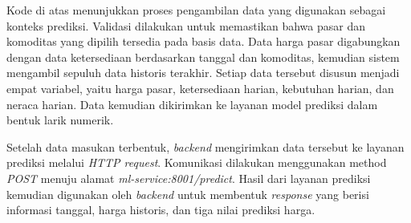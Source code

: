 \begin{code}
\end{code}

Kode di atas menunjukkan proses pengambilan data yang digunakan sebagai konteks prediksi. Validasi dilakukan untuk memastikan bahwa pasar dan komoditas yang dipilih tersedia pada basis data. Data harga pasar digabungkan dengan data ketersediaan berdasarkan tanggal dan komoditas, kemudian sistem mengambil sepuluh data historis terakhir. Setiap data tersebut disusun menjadi empat variabel, yaitu harga pasar, ketersediaan harian, kebutuhan harian, dan neraca harian. Data kemudian dikirimkan ke layanan model prediksi dalam bentuk larik numerik.

Setelah data masukan terbentuk, \textit{backend} mengirimkan data tersebut ke layanan prediksi melalui \textit{HTTP request}. Komunikasi dilakukan menggunakan method \textit{POST} menuju alamat \textit{ml-service:8001/predict}. Hasil dari layanan prediksi kemudian digunakan oleh \textit{backend} untuk membentuk \textit{response} yang berisi informasi tanggal, harga historis, dan tiga nilai prediksi harga.

